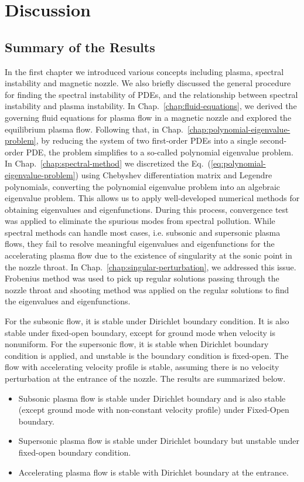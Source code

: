 \chapter{Discussion} \label{chap:discussion}
\section{Summary of the Results}
In the first chapter we introduced various concepts including plasma, spectral instability and magnetic nozzle. We also briefly discussed the general procedure for finding the spectral instability of PDEs, and the relationship between spectral instability and plasma instability. In Chap.~\ref{chap:fluid-equations}, we derived the governing fluid equations for plasma flow in a magnetic nozzle and explored the equilibrium plasma flow. Following that, in Chap.~\ref{chap:polynomial-eigenvalue-problem}, by reducing the system of two first-order PDEs into a single second-order PDE, the problem simplifies to a so-called polynomial eigenvalue problem. In Chap.~\ref{chap:spectral-method} we discretized the Eq.~(\ref{eq:polynomial-eigenvalue-problem}) using Chebyshev differentiation matrix and Legendre polynomials, converting the polynomial eigenvalue problem into an algebraic eigenvalue problem. This allows us to apply well-developed numerical methods for obtaining eigenvalues and eigenfunctions. During this process, convergence test was applied to eliminate the spurious modes from spectral pollution. While spectral methods can handle most cases, i.e. subsonic and supersonic plasma flows, they fail to resolve meaningful eigenvalues and eigenfunctions for the accelerating plasma flow due to the existence of singularity at the sonic point in the nozzle throat. In Chap.~\ref{chap:singular-perturbation}, we addressed this issue. Frobenius method was used to pick up regular solutions passing through the nozzle throat and shooting method was applied on the regular solutions to find the eigenvalues and eigenfunctions.

For the subsonic flow, it is stable under Dirichlet boundary condition. It is also stable under fixed-open boundary, except for ground mode when velocity is nonuniform. For the supersonic flow, it is stable when Dirichlet boundary condition is applied, and unstable is the boundary condition is fixed-open. The flow with accelerating velocity profile is stable, assuming there is no velocity perturbation at the entrance of the nozzle. The results are summarized below.

\begin{itemize}
	\item Subsonic plasma flow is stable under Dirichlet boundary and is also stable (except ground mode with non-constant velocity profile) under Fixed-Open boundary.
	\item Supersonic plasma flow is stable under Dirichlet boundary but unstable under fixed-open boundary condition.
	\item Accelerating plasma flow is stable with Dirichlet boundary at the entrance.
\end{itemize}

